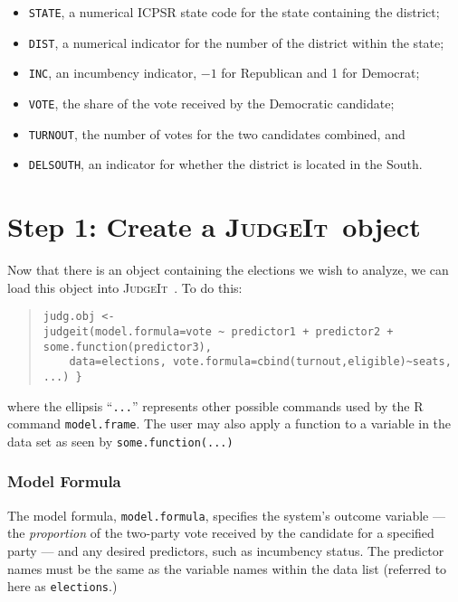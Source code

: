 \documentclass[oneside,letterpaper,titlepage]{article}
\newcommand{\JudgeIt}{\textsc{JudgeIt}\ }
\begin{document}
\begin{itemize}
\item \texttt{STATE}, a numerical ICPSR state code for the state containing the district;

\item \texttt{DIST}, a numerical indicator for the number of the district within the state;

\item \texttt{INC}, an incumbency indicator, $-1$ for Republican and 1 for Democrat;

\item \texttt{VOTE}, the share of the vote received by the Democratic candidate;

\item \texttt{TURNOUT}, the number of votes for the two candidates combined, and

\item \texttt{DELSOUTH}, an indicator for whether the district is located in the South.
\end{itemize}

\section{Step 1: Create a \JudgeIt object}

Now that there is an object containing the elections we wish to analyze, we can load this object into \JudgeIt. To do this:

\begin{quote}
\begin{verbatim}
judg.obj <-
judgeit(model.formula=vote ~ predictor1 + predictor2 + some.function(predictor3),
    data=elections, vote.formula=cbind(turnout,eligible)~seats, ...) }
\end{verbatim}
\end{quote}

\noindent where the ellipsis ``\texttt{...}'' represents other possible commands used by the R command \texttt{model.frame}. The user may also apply a function to a variable in the data set as seen by \texttt{some.function(...)}

\subsubsection*{Model Formula}

The model formula, \texttt{model.formula}, specifies the system's outcome variable --- the \emph{proportion} of the two-party vote received by the candidate for a specified party --- and any desired predictors, such as incumbency status.  The predictor names must be the same as the variable names within the data list (referred to here as \texttt{elections}.)
\end{document}
